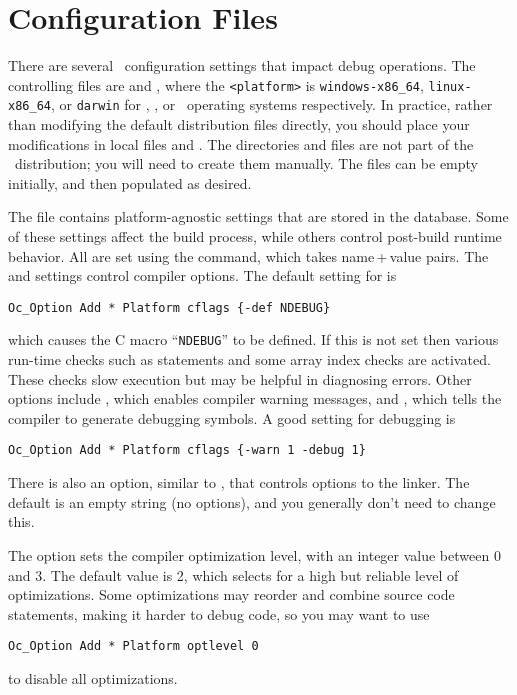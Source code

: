 \section{Configuration Files}\label{sec:debug:configfiles}
There are several \OOMMF\ configuration settings that impact debug
operations. The controlling files are  and
, where the \texttt{<platform>} is
\texttt{windows-x86\_64}, \texttt{linux-x86\_64}, or \texttt{darwin} for
\Windows, \Linux, or \MacOSX\ operating systems respectively. In practice,
rather than modifying the default distribution files directly, you should
place your modifications in local files
 and
.
The  directories and files are not part of the
\OOMMF\ distribution; you will need to create them manually. The files
can be empty initially, and then populated as desired.

The  file contains platform-agnostic settings that are
stored in the  database. Some of these settings affect
the build process, while others control post-build runtime behavior.
All are set using the  command, which takes
name\,+\,value pairs.  The  and  settings
control compiler options. The default setting for  is
\begin{verbatim}
Oc_Option Add * Platform cflags {-def NDEBUG}
\end{verbatim}
which causes the C macro ``\texttt{NDEBUG}'' to be defined. If this is
not set then various run-time checks such as  statements and
some array index checks are activated. These checks slow execution but
may be helpful in diagnosing errors. Other  options include
, which enables compiler warning messages, and ,
which tells the compiler to generate debugging symbols. A good
 setting for debugging is
\begin{verbatim}
Oc_Option Add * Platform cflags {-warn 1 -debug 1}
\end{verbatim}
There is also an  option, similar to , that
controls options to the linker. The default is an empty string (no
options), and you generally don't need to change this.

The  option sets the compiler optimization level, with an
integer value between 0 and 3. The default value is 2, which selects for
a high but reliable level of optimizations. Some optimizations may
reorder and combine source code statements, making it harder to debug
code, so you may want to use
\begin{verbatim}
Oc_Option Add * Platform optlevel 0
\end{verbatim}
to disable all optimizations.

